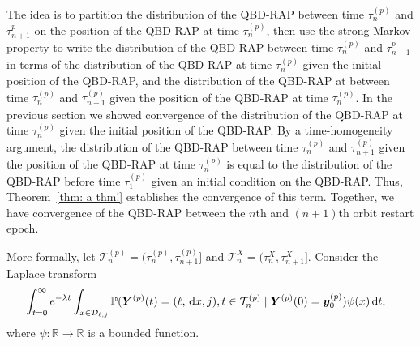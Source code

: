 The idea is to partition the distribution of the QBD-RAP between time \(\tau_n^{(p)}\) and \(\tau_{n+1}^p\) on the position of the QBD-RAP at time \(\tau_n^{(p)}\), then use the strong Markov property to write the distribution of the QBD-RAP between time \(\tau_n^{(p)}\) and \(\tau_{n+1}^p\) in terms of the distribution of the QBD-RAP at time \(\tau_n^{(p)}\) given the initial position of the QBD-RAP, and the distribution of the QBD-RAP at between time \(\tau_n^{(p)}\) and \(\tau_{n+1}^{(p)}\) given the position of the QBD-RAP at time \(\tau_n^{(p)}\). In the previous section we showed convergence of the distribution of the QBD-RAP at time \(\tau_n^{(p)}\) given the initial position of the QBD-RAP. By a time-homogeneity argument, the distribution of the QBD-RAP between time \(\tau_n^{(p)}\) and \(\tau_{n+1}^{(p)}\) given the position of the QBD-RAP at time \(\tau_n^{(p)}\) is equal to the distribution of the QBD-RAP before time \(\tau_1^{(p)}\) given an initial condition on the QBD-RAP. Thus, Theorem~\ref{thm: a thm!} establishes the convergence of this term. Together, we have convergence of the QBD-RAP between the \(n\)th and \((n+1)\)th orbit restart epoch. 

More formally, let \(\mathcal T_n^{(p)} = (\tau_{n}^{(p)},\tau_{n+1}^{(p)}]\) and \(\mathcal T_n^X=(\tau_n^X,\tau_{n+1}^X]\). Consider the Laplace transform 
\begin{align}
	&\int_{t=0}^\infty e^{-\lambda t}\int_{x\in\mathcal{D}_{\ell,j}}\mathbb P({\boldsymbol Y}^{(p)}(t) = (\ell, \, \mathrm{d} x, j), t\in\mathcal T_n^{(p)} \mid 
	\boldsymbol Y^{(p)}(0)=\boldsymbol y_0^{(p)})\psi(x)\, \mathrm{d} t, \label{eqn: aaabbababbaa}
\end{align}
where \(\psi:\mathbb R\to \mathbb R\) is a bounded function. 

